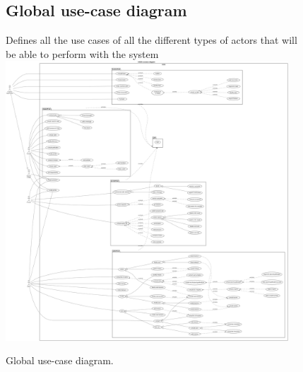 \documentclass[]{uc2pfecaneva}
\begin{document}
    \begin{figure}[ht]
        \subsection{Global use-case diagram}
        Defines all the use cases of all the different types of actors that will be able to perform with the
        system
        \centering
        \includegraphics[width=300pt]{images/GUCD}

        \caption{Global use-case diagram.}
    \end{figure}
    \clearpage
\end{document}
